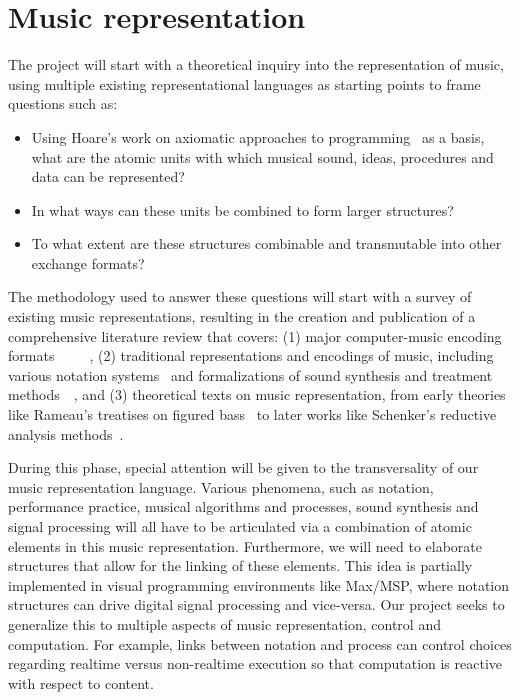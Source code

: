 \documentclass{article}
\begin{document}
\section{Music representation}\label{sec:music-representation}
The project will start with a theoretical inquiry into the representation of
music, using multiple existing representational languages as starting points
to frame questions such as:
\begin{itemize}
\item Using Hoare's work on axiomatic approaches to
programming~\cite{hoare1969axiomatic} as a basis, what are the atomic units
with which musical sound, ideas, procedures and data can be represented?
\item In what ways can these units be combined to form
larger structures?
\item To what extent are these structures combinable and transmutable into
other exchange formats?
\end{itemize}

The methodology used to answer these questions will start with a survey of
existing music representations, resulting in the creation and publication of
a comprehensive literature review that covers: (1) major computer-music
encoding
formats~\cite{hoos98}~\cite{lilypond06}~\cite{good2001musicxml}~\cite{alvaro2010musicjson}~\cite{roland2002music},
(2) traditional representations and encodings of music,
including various notation systems~\cite{hultberg2000printed} and formalizations
of sound synthesis and treatment
methods~\cite{mason1953feedback}~\cite{foote1999visualizing},
and (3) theoretical texts on music representation, from
early theories like Rameau's treatises on figured bass~\cite{rameau:1722} to later works
like Schenker’s reductive analysis methods~\cite{schenker:1935}.

During this phase, special attention will be given to the transversality of
our music representation language.  Various phenomena, such as notation,
performance practice, musical algorithms and processes, sound synthesis and
signal processing will all have to be articulated via a combination of
atomic elements in this music representation.  Furthermore, we will need to
elaborate structures that allow for the linking of these elements.
This idea is partially implemented in visual programming environments like Max/MSP, where notation
structures can drive digital signal processing and vice-versa. Our project
seeks to generalize this to multiple aspects of music representation, control and
computation. For example, links between notation and process can control choices regarding
real\-time versus non-real\-time execution so that computation is reactive with
respect to content.
\end{document}
